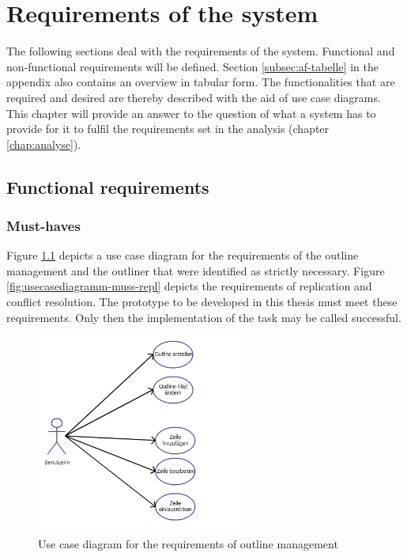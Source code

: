 \chapter{Requirements of the system}
\label{chap:systemanforderungen}

The following sections deal with the requirements of the system. Functional and non-functional requirements will be defined. Section \ref{subsec:af-tabelle} in the appendix also contains an overview in tabular form. The functionalities that are required and desired are thereby described with the aid of use case diagrams. This chapter will provide an answer to the question of what a system has to provide for it to fulfil the requirements set in the analysis (chapter \ref{chap:analyse}).


\section{Functional requirements}
\label{sec:funktionale-af}

\subsection{Must-haves}
\label{subsec:muss}

Figure \ref{fig:usecasediagramm-muss-editor} depicts a use case diagram for the requirements of the outline management and the outliner that were identified as strictly necessary. Figure \ref{fig:usecasediagramm-muss-repl} depicts the requirements of replication and conflict resolution. The prototype to be developed in this thesis must meet these requirements. Only then the implementation of the task may be called successful.

\medskip
\begin{figure}[ht] 
  \begin{center}
  \includegraphics[width=0.6\textwidth]{grafik/usecasediagramm-muss-editor} 
  \end{center}
  \caption{Use case diagram for the requirements of outline management}
  \label{fig:usecasediagramm-muss-editor} 
\end{figure}

